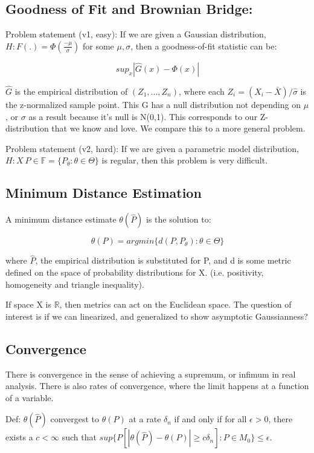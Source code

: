 	\subsection{Goodness of Fit and Brownian Bridge:}
	  	Problem statement (v1, easy): If we are given a Gaussian distribution, $H: F(.) = \Phi(\frac{-\mu}{\sigma})$ for some $\mu, \sigma$, then a goodness-of-fit statistic can be:

	  	$$sup_x | \hat{G}(x) - \Phi(x) |$$

	  	$\hat{G}$ is the empirical distribution of $(Z_1, ..., Z_n)$, where each $Z_i = (X_i - \bar{X})/\hat{\sigma}$ is the z-normalized sample point. This G has a null distribution not depending on $\mu$, or $\sigma$ as a result because it's null is N(0,1). This corresponds to our Z-distribution that we know and love. We compare this to a more general problem.

	  	Problem statement (v2, hard): If we are given a parametric model distribution, $H: X ~ P \in \mathbb{F} = \{P_\theta : \theta \in \Theta \}$ is regular, then this problem is very difficult. 

	\subsection{Minimum Distance Estimation}
		A minimum distance estimate $\theta(\hat{P})$ is the solution to:

		$$\theta(P) = argmin\{ d(P, P_\theta) : \theta \in \Theta \}$$

		where $\hat{P}$, the empirical distribution is substituted for P, and d is some metric defined on the space of probability distributions for X. (i.e. positivity, homogeneity and triangle inequality). 

		If space X is $\mathbb{R}$, then metrics can act on the Euclidean space. The question of interest is if we can linearized, and generalized to show asymptotic Gaussianness? 

	\subsection{Convergence}

		There is convergence in the sense of achieving a supremum, or infimum in real analysis. There is also rates of convergence, where the limit happens at a function of a variable.

		Def: $\theta(\hat{P})$ convergest to $\theta(P)$ at a rate $\delta_n$ if and only if for all $\epsilon > 0$, there exists a $c < \infty$ such that $sup\{P [ |\theta(\hat{P}) - \theta(P)| \ge c \delta_n ] : P \in M_0 \} \le \epsilon$.

